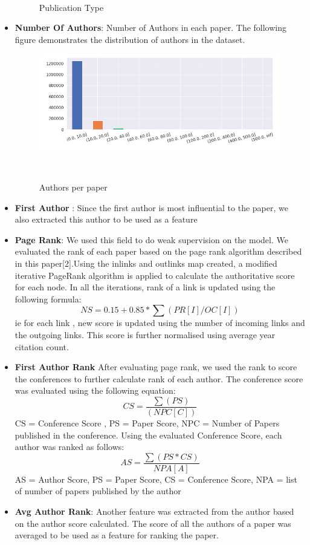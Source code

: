 \documentclass[a4paper, 11pt]{article}
\begin{document}
\begin{itemize}
\begin{figure}[ht]
  \caption{Publication Type}~\label{fig:Reach}
\end{figure}
\FloatBarrier
    \item \textbf{Number Of Authors}: Number of Authors in each paper. The following figure demonstrates the distribution of authors in the dataset.
    \begin{figure}[ht]
    \centering
  \includegraphics[width=0.6\columnwidth]{Number_Of_Authors.png}
  \caption{Authors per paper}~\label{fig:Reach}
\end{figure}
\FloatBarrier
    \item \textbf{First Author} : Since the first author is most influential to the paper, we also extracted this author to be used as a feature
    \item \textbf{Page Rank}: We used this field to do weak supervision on the model. We evaluated the rank of each paper based on the page rank algorithm described in this paper[2].Using the inlinks and outlinks map created, a modified iterative PageRank algorithm is applied to  calculate the authoritative score for each node. In all the iterations, rank of a link is updated using the following formula:
\[ NS = 0.15 + 0.85 * \sum (PR[I]/OC[I]) \]
ie for each link , new score is updated using the number of incoming links and the outgoing links. This score is further normalised using average year citation count. 
    \item \textbf{First Author Rank} After evaluating page rank, we used the rank to score the conferences to further calculate rank of each author. The conference score was evaluated using the following equation:
    \[ CS=\frac{\sum (PS)}{(NPC[C])} \]
    CS = Conference Score , PS = Paper Score, NPC = Number of Papers published in the conference.\newline
    Using the evaluated Conference Score, each author was ranked as follows:
    \[ AS = \frac{\sum (PS*CS)}{NPA[A]} 
    \]
    AS = Author Score, PS = Paper Score, CS = Conference Score, NPA = list of number of papers published by the author
    \item \textbf{Avg Author Rank}: Another feature was extracted from the author based on the author score calculated. The score of all the authors of a paper was averaged to be used as a feature for ranking the paper.

\end{itemize}
\end{document}
